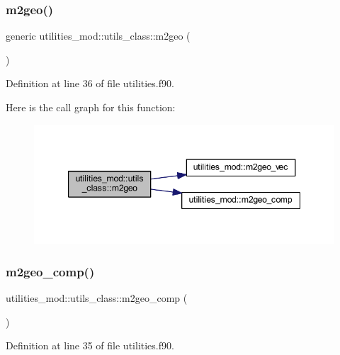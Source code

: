 \subsubsection{\texorpdfstring{m2geo()}{m2geo()}}
{\footnotesize\ttfamily generic utilities\+\_\+mod\+::utils\+\_\+class\+::m2geo (\begin{DoxyParamCaption}{ }\end{DoxyParamCaption})\hspace{0.3cm}{\ttfamily [private]}}



Definition at line 36 of file utilities.\+f90.

Here is the call graph for this function\+:\nopagebreak
\begin{figure}[H]
\begin{center}
\leavevmode
\includegraphics[width=347pt]{structutilities__mod_1_1utils__class_a345230eb5aac79b78603538f0fd0e36e_cgraph}
\end{center}
\end{figure}
\mbox{\label{structutilities__mod_1_1utils__class_a8cceeee65240f821428cd4dc65fd5fa0}} 
\subsubsection{\texorpdfstring{m2geo\+\_\+comp()}{m2geo\_comp()}}
{\footnotesize\ttfamily utilities\+\_\+mod\+::utils\+\_\+class\+::m2geo\+\_\+comp (\begin{DoxyParamCaption}{ }\end{DoxyParamCaption})\hspace{0.3cm}{\ttfamily [private]}}



Definition at line 35 of file utilities.\+f90.

